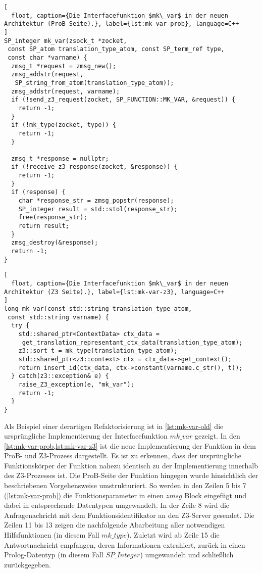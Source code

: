 \begin{lstlisting}[
  float, caption={Die Interfacefunktion $mk\_var$ in der neuen Architektur (ProB Seite).}, label={lst:mk-var-prob}, language=C++
]
SP_integer mk_var(zsock_t *zocket,
 const SP_atom translation_type_atom, const SP_term_ref type,
 const char *varname) {
  zmsg_t *request = zmsg_new();
  zmsg_addstr(request,
   SP_string_from_atom(translation_type_atom));
  zmsg_addstr(request, varname);
  if (!send_z3_request(zocket, SP_FUNCTION::MK_VAR, &request)) {
    return -1;
  }
  if (!mk_type(zocket, type)) {
    return -1;
  }

  zmsg_t *response = nullptr;
  if (!receive_z3_response(zocket, &response)) {
    return -1;
  }
  if (response) {
    char *response_str = zmsg_popstr(response);
    SP_integer result = std::stol(response_str);
    free(response_str);
    return result;
  }
  zmsg_destroy(&response);
  return -1;
}
\end{lstlisting}

\begin{lstlisting}[
  float, caption={Die Interfacefunktion $mk\_var$ in der neuen Architektur (Z3 Seite).}, label={lst:mk-var-z3}, language=C++
]
long mk_var(const std::string translation_type_atom,
 const std::string varname) {
  try {
    std::shared_ptr<ContextData> ctx_data = 
     get_translation_representant_ctx_data(translation_type_atom);
    z3::sort t = mk_type(translation_type_atom);
    std::shared_ptr<z3::context> ctx = ctx_data->get_context();
    return insert_id(ctx_data, ctx->constant(varname.c_str(), t));
  } catch(z3::exception& e) {
    raise_Z3_exception(e, "mk_var");
    return -1;
  }
}
\end{lstlisting}

Als Beispiel einer derartigen Refaktorisierung ist in \cref{lst:mk-var-old} die ursprüngliche Implementierung der Interfacefunktion $mk\_var$ gezeigt.
In den \cref{lst:mk-var-prob,lst:mk-var-z3} ist die neue Implementierung der Funktion in dem ProB- und Z3-Prozess dargestellt.
Es ist zu erkennen, dass der ursprüngliche Funktionskörper der Funktion nahezu identisch zu der Implementierung innerhalb des Z3-Prozesses ist.
Die ProB-Seite der Funktion hingegen wurde hinsichtlich der beschriebenen Vorgehensweise umstrukturiert.
So werden in den Zeilen 5 bis 7 (\cref{lst:mk-var-prob}) die Funktionsparameter in einen $zmsg$ Block eingefügt und dabei in entsprechende Datentypen umgewandelt.
In der Zeile 8 wird die Anfragenachricht mit dem Funktionsidentifikator an den Z3-Server gesendet.
Die Zeilen 11 bis 13 zeigen die nachfolgende Abarbeitung aller notwendigen Hilfsfunktionen (in diesem Fall $mk\_type$).
Zuletzt wird ab Zeile 15 die Antwortnachricht empfangen, deren Informationen extrahiert, zurück in einen Prolog-Datentyp (in diesem Fall $SP\_Integer$) umgewandelt und schließlich zurückgegeben.

